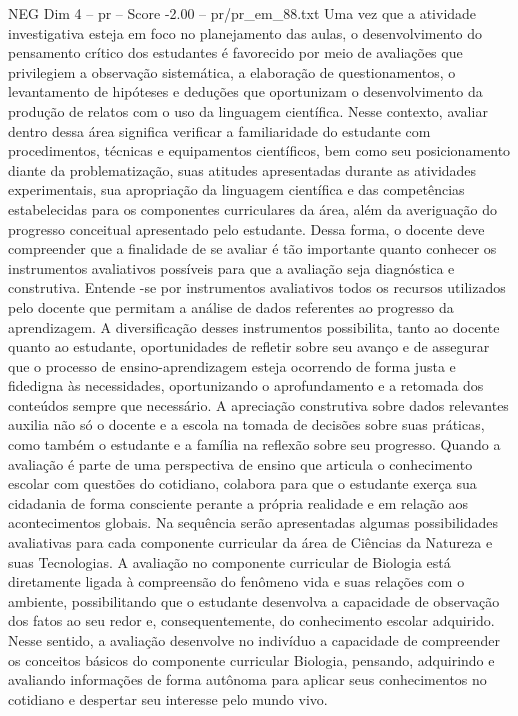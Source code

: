 \begin{textsample}{NEG Dim 4 – pr – Score -2.00 – pr/pr\_em\_88.txt}
Uma vez que a atividade investigativa esteja em foco no planejamento das aulas, o desenvolvimento do pensamento crítico dos estudantes é favorecido por meio de avaliações que privilegiem a observação sistemática, a elaboração de questionamentos, o levantamento de hipóteses e deduções que oportunizam o desenvolvimento da produção de relatos com o uso da linguagem científica.
Nesse contexto, avaliar dentro dessa área significa verificar a familiaridade do estudante com procedimentos, técnicas e equipamentos científicos, bem como seu posicionamento diante da problematização, suas atitudes apresentadas durante as atividades experimentais, sua apropriação da linguagem científica e das competências estabelecidas para os componentes curriculares da área, além da averiguação do progresso conceitual apresentado pelo estudante.
Dessa forma, o docente deve compreender que a finalidade de se avaliar é tão importante quanto conhecer os instrumentos avaliativos possíveis para que a avaliação seja diagnóstica e construtiva.
Entende -se por instrumentos avaliativos todos os recursos utilizados pelo docente que permitam a análise de dados referentes ao progresso da aprendizagem.
A diversificação desses instrumentos possibilita, tanto ao docente quanto ao estudante, oportunidades de refletir sobre seu avanço e de assegurar que o processo de ensino-aprendizagem esteja ocorrendo de forma justa e fidedigna às necessidades, oportunizando o aprofundamento e a retomada dos conteúdos sempre que necessário.
A apreciação construtiva sobre dados relevantes auxilia não só o docente e a escola na tomada de decisões sobre suas práticas, como também o estudante e a família na reflexão sobre seu progresso.
Quando a avaliação é parte de uma perspectiva de ensino que articula o conhecimento escolar com questões do cotidiano, colabora para que o estudante exerça sua cidadania de forma consciente perante a própria realidade e em relação aos acontecimentos globais.
Na sequência serão apresentadas algumas possibilidades avaliativas para cada componente curricular da área de Ciências da Natureza e suas Tecnologias.
A avaliação no componente curricular de Biologia está diretamente ligada à compreensão do fenômeno vida e suas relações com o ambiente, possibilitando que o estudante desenvolva a capacidade de observação dos fatos ao seu redor e, consequentemente, do conhecimento escolar adquirido.
Nesse sentido, a avaliação desenvolve no indivíduo a capacidade de compreender os conceitos básicos do componente curricular Biologia, pensando, adquirindo e avaliando informações de forma autônoma para aplicar seus conhecimentos no cotidiano e despertar seu interesse pelo mundo vivo.

\end{textsample}

